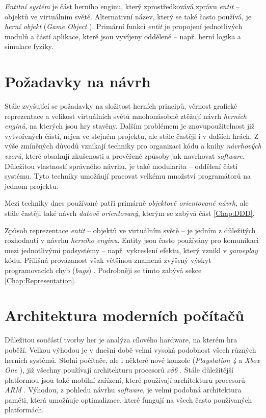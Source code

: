 \emph{Entitní systém} je část herního enginu, který zprostředkovává zprávu \emph{entit} -- objektů ve virtuálním světě. Alternativní název, který se také často používá, je \emph{herní objekt} (\emph{Game Object} \cite{UnityGo}). Primární funkcí \emph{entit} je propojení jednotlivých modulů a částí aplikace, které jsou vyvíjeny odděleně -- např. herní logika a simulace fyziky.


\section{Požadavky na návrh}

Stále zvyšující se požadavky na složitost herních principů, věrnost grafické reprezentace a velikost virtuálních světů mnohonásobně ztěžují návrh \emph{herních enginů}, na kterých jsou hry stavěny. Dalším problémem je znovupoužitelnost již vytvořených částí, nejen ve stejném projektu, ale stále častěji i v dalších hrách. Z výše zmíněných důvodů vznikají techniky pro organizaci kódu a knihy \emph{návrhových vzorů}\cite{DesignPatterns}\cite{GameDesignPatterns}, které obsahují zkušenosti a prověřené způsoby jak navrhovat \emph{software}. Důležitou vlastností správného návrhu, je také modularita -- oddělení částí systému. Tyto techniky umožňují pracovat velkému množství programátorů na jednom projektu.

Mezi techniky dnes používané patří primárně \emph{objektově orientované návrh}, ale stále častěji také návrh \emph{datově orientovaný}, kterým se zabývá část \ref{Chap:DDD}.

Způsob reprezentace \emph{entit} -- objektů ve virtuálním světě -- je jedním z důležitých rozhodnutí v návrhu \emph{herního enginu}. Entity jsou často používány pro komunikaci mezi jednotlivými podsystémy -- např. vykreslení efektu, který vznikl v \emph{gameplay} kódu. Přílišná provázanost však většinou znamená zvýšený výskyt programovacích chyb (\emph{bugs}) \cite{GameDesignPatterns}. Podrobněji se tímto zabývá sekce \ref{Chap:Representation}.

\section{Architektura moderních počítačů}

Důležitou součástí tvorby her je analýza cílového hardware, na kterém hra poběží. Velkou výhodou je v dnešní době velmi vysoká podobnost všech různých herních systémů. Stolní počítače, ale i některé nové konzole (\emph{Playstation 4} a \emph{Xbox One} \cite{Ps4Xbox}), již všechny používají architekturu procesorů \emph{x86} \cite{IntelX86-64} \cite{AmdX86-64}. Stále důležitější platformou jsou také mobilní zařízení, které používají architekturu procesorů \emph{ARM} \cite{ARM}. Výhodou, z pohledu návrhu \emph{software}, je velmi podobná architektura paměti, která umožňuje optimalizace, které fungují na všech často používaných platformách.

